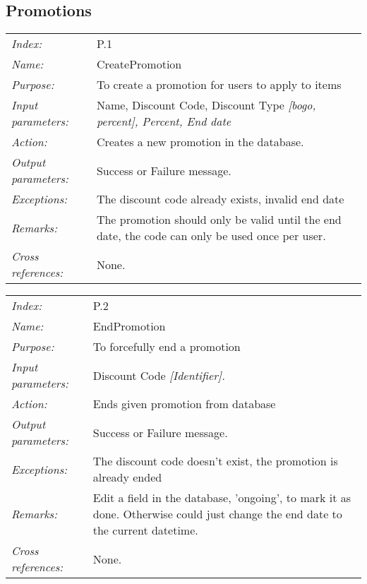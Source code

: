 \documentclass[10pt,letter]{article}
\begin{document}
\subsection{Promotions}

\begin{tabularx}{\textwidth}{l X}
    \it{Index:} & P.1 \\
    \it{Name:} & CreatePromotion \\
    \it{Purpose:} & To create a promotion for users to apply to items \\
    \it{Input parameters:} & Name, Discount Code, Discount Type \it{[bogo, percent]}, Percent, End date\\
    \it{Action:} & Creates a new promotion in the database.\\
    \it{Output parameters:} & Success or Failure message. \\
    \it{Exceptions:} & The discount code already exists, invalid end date \\
    \it{Remarks:} & The promotion should only be valid until the end date, the code can only be used once per user. \\
    \it{Cross references:} & None. \\
    \hline
\end{tabularx}

\begin{tabularx}{\textwidth}{l X}
    \it{Index:} & P.2 \\
    \it{Name:} & EndPromotion \\
    \it{Purpose:} & To forcefully end a promotion \\
    \it{Input parameters:} & Discount Code \it{[Identifier]}.\\
    \it{Action:} & Ends given promotion from database\\
    \it{Output parameters:} & Success or Failure message. \\
    \it{Exceptions:} & The discount code doesn't exist, the promotion is already ended \\
    \it{Remarks:} & Edit a field in the database, 'ongoing', to mark it as done. Otherwise could just change the end date to the current datetime.\\
    \it{Cross references:} & None. \\
    \hline
\end{tabularx}
\end{document}
